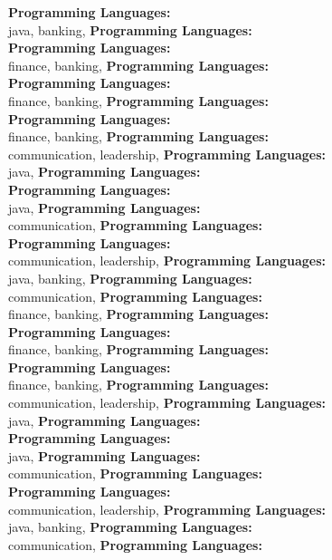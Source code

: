 \textbf{Programming Languages:} \\
java, banking, \textbf{Programming Languages:} \\
\textbf{Programming Languages:} \\
finance, banking, \textbf{Programming Languages:} \\
\textbf{Programming Languages:} \\
finance, banking, \textbf{Programming Languages:} \\
\textbf{Programming Languages:} \\
finance, banking, \textbf{Programming Languages:} \\
communication, leadership, \textbf{Programming Languages:} \\
java, \textbf{Programming Languages:} \\
\textbf{Programming Languages:} \\
java, \textbf{Programming Languages:} \\
communication, \textbf{Programming Languages:} \\
\textbf{Programming Languages:} \\
communication, leadership, \textbf{Programming Languages:} \\
java, banking, \textbf{Programming Languages:} \\
communication, \textbf{Programming Languages:} \\
finance, banking, \textbf{Programming Languages:} \\
\textbf{Programming Languages:} \\
finance, banking, \textbf{Programming Languages:} \\
\textbf{Programming Languages:} \\
finance, banking, \textbf{Programming Languages:} \\
communication, leadership, \textbf{Programming Languages:} \\
java, \textbf{Programming Languages:} \\
\textbf{Programming Languages:} \\
java, \textbf{Programming Languages:} \\
communication, \textbf{Programming Languages:} \\
\textbf{Programming Languages:} \\
communication, leadership, \textbf{Programming Languages:} \\
java, banking, \textbf{Programming Languages:} \\
communication, \textbf{Programming Languages:} \\
